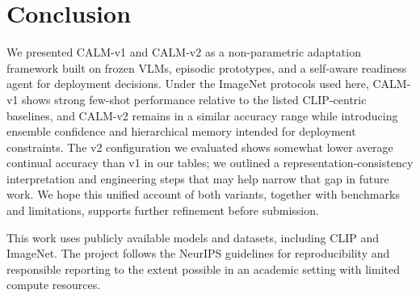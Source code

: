 \documentclass{article}
\begin{document}
\section{Conclusion}
We presented CALM-v1 and CALM-v2 as a non-parametric adaptation framework built on frozen VLMs, episodic prototypes, and a self-aware readiness agent for deployment decisions. Under the ImageNet protocols used here, CALM-v1 shows strong few-shot performance relative to the listed CLIP-centric baselines, and CALM-v2 remains in a similar accuracy range while introducing ensemble confidence and hierarchical memory intended for deployment constraints. The v2 configuration we evaluated shows somewhat lower average continual accuracy than v1 in our tables; we outlined a representation-consistency interpretation and engineering steps that may help narrow that gap in future work. We hope this unified account of both variants, together with benchmarks and limitations, supports further refinement before submission.

\begin{ack}
This work uses publicly available models and datasets, including CLIP and ImageNet. The project follows the NeurIPS guidelines for reproducibility and responsible reporting to the extent possible in an academic setting with limited compute resources.
\end{ack}

\nocite{he2024peftsurvey,lester2021prompttuning,houlsby2019adapters,hu2022lora,wang2024vladapter,chen2024trainclip,wang2024llmclsurvey,wang2022l2p,lomonaco2024continualreview,smith2024cops,chen2024conformalvlm,liu2024oodllm,zhang2024hallucinationvlm,zhang2024humanloop,martinez2024hri,thompson2024calibration,davis2024vlmreview,krizhevsky2009cifar,coates2011stl10,xiao2017fashionmnist}




\appendix
\newpage

\end{document}

